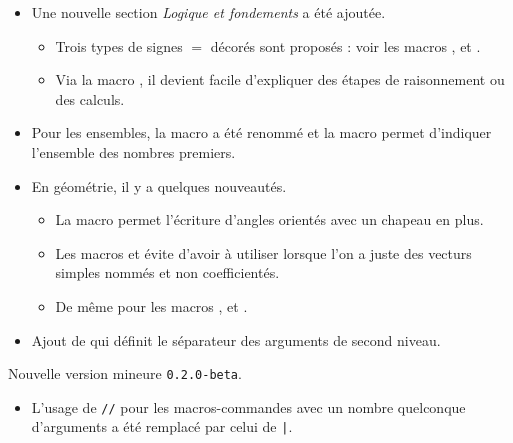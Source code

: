 \documentclass[12pt,a4paper]{book}
\begin{document}
\begin{description}
\begin{itemize}[itemsep=.5em]
    \item Une nouvelle section \emph{\og Logique et fondements \fg} a été ajoutée.
    \begin{itemize}[itemsep=.5em]
        \item Trois types de signes $=$ décorés sont proposés : voir les macros  ,  et .

        \item Via la macro , il devient facile d'expliquer des étapes de raisonnement ou des calculs.
    \end{itemize}




    \item Pour les ensembles, la macro  a été renommé  et la macro  permet d'indiquer l'ensemble des nombres premiers.




    \item En géométrie, il y a quelques nouveautés.
    \begin{itemize}[itemsep=.5em]
        \item La macro  permet l'écriture d'angles orientés avec un chapeau en plus.

        \item Les macros  et  évite d'avoir à utiliser  lorsque l'on a juste des vecturs simples nommés et non coefficientés.

        \item De même pour les macros ,  et .
    \end{itemize}




    \item Ajout de  qui définit le séparateur des arguments de second niveau.
\end{itemize}

\end{description}\begin{description}
\medskip
\item[2019-02-21] Nouvelle version mineure \verb+0.2.0-beta+.

\begin{itemize}[itemsep=.5em]
    \item L'usage de \verb+//+ pour les macros-commandes avec un nombre quelconque d'arguments a été remplacé par celui de \verb+|+.



\end{itemize}
\end{description}
\end{document}
